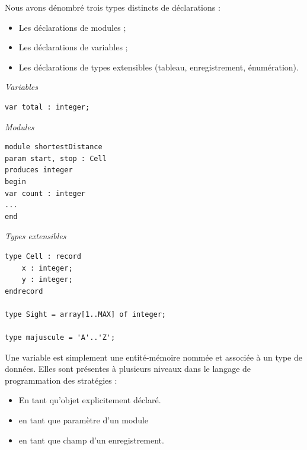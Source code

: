\documentclass[oneside,a4paper]{book}
\begin{document}
Nous avons dénombré trois types distincts de déclarations :
\begin{itemize}
    \item Les déclarations de modules ;
    \item Les déclarations de variables ;
    \item Les déclarations de types extensibles (tableau, enregistrement, énumération).
\end{itemize}\newline

\begin{minipage}[t]{.33\textwidth}
    \textit{Variables}
     \begin{lstlisting}
var total : integer;
     \end{lstlisting}
\end{minipage}
\begin{minipage}[t]{.33\textwidth}
    \textit{Modules}
     \begin{lstlisting}
module shortestDistance
param start, stop : Cell
produces integer
begin
var count : integer
...
end
     \end{lstlisting}
\end{minipage}
\begin{minipage}[t]{.33\textwidth}
    \textit{Types extensibles}
     \begin{lstlisting}
type Cell : record
    x : integer;
    y : integer;
endrecord

type Sight = array[1..MAX] of integer;

type majuscule = 'A'..'Z';
     \end{lstlisting}
\end{minipage}\newline

\begin{samepage}
Une variable est simplement une entité-mémoire nommée et associée à un type de données. Elles sont présentes à plusieurs niveaux dans le langage de programmation des stratégies :
    \begin{itemize}
        \item En tant qu'objet explicitement déclaré.
        \item en tant que paramètre d'un module
        \item en tant que champ d'un enregistrement.
    \end{itemize}
\end{samepage}
\end{document}
